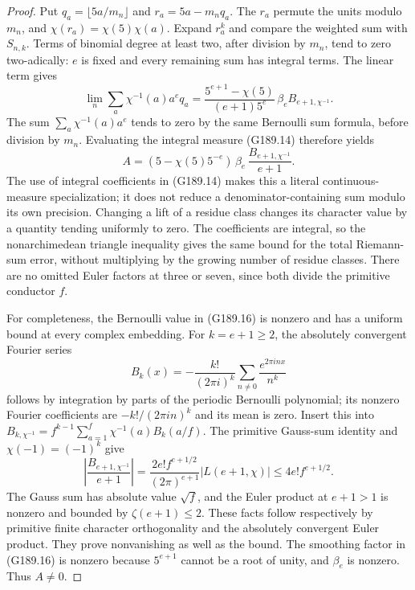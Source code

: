 \begin{proof}
Put $q_a=\lfloor5a/m_n\rfloor$ and $r_a=5a-m_nq_a$.
The $r_a$ permute the units modulo $m_n$, and
$\chi(r_a)=\chi(5)\chi(a)$.
Expand $r_a^k$ and compare the weighted sum with $S_{n,k}$.
Terms of binomial degree at least two, after division by $m_n$,
tend to zero two-adically: $e$ is fixed and every remaining sum
has integral terms.  The linear term gives
\[
 \lim_n\sum_a\chi^{-1}(a)a^e q_a
  =\frac{5^{e+1}-\chi(5)}{(e+1)5^e}\,
                             \beta_e B_{e+1,\chi^{-1}}.
\]
The sum $\sum_a\chi^{-1}(a)a^e$ tends to zero by the same
Bernoulli sum formula, before division by $m_n$.
Evaluating the integral measure (G189.14) therefore yields
\[
 A=(5-\chi(5)5^{-e})\,\beta_e\,
                    \frac{B_{e+1,\chi^{-1}}}{e+1}.
 \tag{G189.16}
\]
The use of integral coefficients in (G189.14) makes this a
literal continuous-measure specialization; it does not reduce
a denominator-containing sum modulo its own precision.
Changing a lift of a residue class changes its character value
by a quantity tending uniformly to zero.  The coefficients are
integral, so the nonarchimedean triangle inequality gives the
same bound for the total Riemann-sum error, without multiplying
by the growing number of residue classes.
There are no omitted Euler factors at three or seven, since
both divide the primitive conductor $f$.

For completeness, the Bernoulli value in (G189.16) is nonzero
and has a uniform bound at every complex embedding.
For $k=e+1\geq2$, the absolutely convergent Fourier series
\[
 B_k(x)=-\frac{k!}{(2\pi i)^k}
                  \sum_{n\ne0}\frac{e^{2\pi i n x}}{n^k}
\]
follows by integration by parts of the periodic Bernoulli
polynomial; its nonzero Fourier coefficients are
$-k!/(2\pi i n)^k$ and its mean is zero.
Insert this into
$B_{k,\chi^{-1}}=f^{k-1}\sum_{a=1}^f\chi^{-1}(a)B_k(a/f)$.
The primitive Gauss-sum identity and
$\chi(-1)=(-1)^k$ give
\[
 \left|\frac{B_{e+1,\chi^{-1}}}{e+1}\right|
  =\frac{2e!f^{e+1/2}}{(2\pi)^{e+1}}
                      |L(e+1,\chi)|
  \leq4e!f^{e+1/2}.
 \tag{G189.17}
\]
The Gauss sum has absolute value $\sqrt f$, and the Euler
product at $e+1>1$ is nonzero and bounded by $\zeta(e+1)\leq2$.
These facts follow respectively by primitive finite character
orthogonality and the absolutely convergent Euler product.
They prove nonvanishing as well as the bound.
The smoothing factor in (G189.16) is nonzero because
$5^{e+1}$ cannot be a root of unity, and $\beta_e$ is nonzero.
Thus $A\ne0$.


\end{proof}
